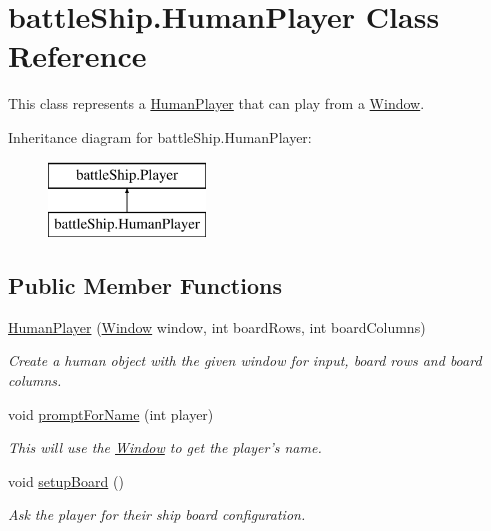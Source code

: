 \hypertarget{classbattleShip_1_1HumanPlayer}{\section{battle\-Ship.\-Human\-Player Class Reference}
\label{classbattleShip_1_1HumanPlayer}
}


This class represents a \hyperlink{classbattleShip_1_1HumanPlayer}{Human\-Player} that can play from a \hyperlink{classbattleShip_1_1Window}{Window}.  


Inheritance diagram for battle\-Ship.\-Human\-Player\-:\begin{figure}[H]
\begin{center}
\leavevmode
\includegraphics[height=2.000000cm]{classbattleShip_1_1HumanPlayer}
\end{center}
\end{figure}
\subsection*{Public Member Functions}
\begin{DoxyCompactItemize}
\item 
\hyperlink{classbattleShip_1_1HumanPlayer_a0e7b1784197eb8c8c80213d0b6e87660}{Human\-Player} (\hyperlink{classbattleShip_1_1Window}{Window} window, int board\-Rows, int board\-Columns)
\begin{DoxyCompactList}\small\item\em Create a human object with the given window for input, board rows and board columns. \end{DoxyCompactList}\item 
\hypertarget{classbattleShip_1_1HumanPlayer_a64c17bd80baa5f1b2bcb36b34d0746eb}{void \hyperlink{classbattleShip_1_1HumanPlayer_a64c17bd80baa5f1b2bcb36b34d0746eb}{prompt\-For\-Name} (int player)}\label{classbattleShip_1_1HumanPlayer_a64c17bd80baa5f1b2bcb36b34d0746eb}

\begin{DoxyCompactList}\small\item\em This will use the \hyperlink{classbattleShip_1_1Window}{Window} to get the player's name. \end{DoxyCompactList}\item 
\hypertarget{classbattleShip_1_1HumanPlayer_ac054fa48213ba59b14c105d686491df9}{void \hyperlink{classbattleShip_1_1HumanPlayer_ac054fa48213ba59b14c105d686491df9}{setup\-Board} ()}\label{classbattleShip_1_1HumanPlayer_ac054fa48213ba59b14c105d686491df9}

\begin{DoxyCompactList}\small\item\em Ask the player for their ship board configuration. \end{DoxyCompactList}\end{DoxyCompactItemize}
